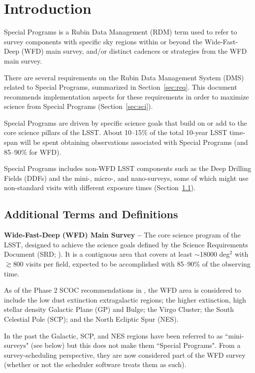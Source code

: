 \section{Introduction} \label{sec:intro}

Special Programs is a Rubin Data Management (RDM) term used to refer to survey 
components with specific sky regions within or beyond the 
Wide-Fast-Deep (WFD) main survey, and/or distinct cadences or 
strategies from the WFD main survey.

There are several requirements on the Rubin Data Management System (DMS) 
related to Special Programs, summarized in Section~\ref{sec:req}.
This document recommends implementation aspects for these requirements in order to 
maximize science from Special Programs (Section~\ref{sec:sci}).

Special Programs are driven by specific science goals that build on or 
add to the core science pillars of the LSST.
About 10--15\% of the total 10-year LSST time-span will be spent obtaining 
observations associated with Special Programs (and 85--90\% for WFD).

Special Programs includes non-WFD LSST components such as the Deep Drilling 
Fields (DDFs) and the mini-, micro-, and nano-surveys, some of which 
might use non-standard visits with different exposure times
(Section~\ref{ssec:intro_terms}).


\subsection{Additional Terms and Definitions}\label{ssec:intro_terms}

\textbf{Wide-Fast-Deep (WFD) Main Survey -- }
The core science program of the LSST, designed to achieve the science 
goals defined by the Science Requirements Document (SRD; ).
It is a contiguous area that covers at least $\sim$18000 deg$^2$ with 
$\gtrsim$800 visits per field, expected to be accomplished with 85--90\% 
of the observing time.

As of the Phase 2 SCOC recommendations in , the WFD area 
is considered to include the low dust extinction extragalactic regions; 
the higher extinction, high stellar density Galactic Plane (GP) and Bulge; the 
Virgo Cluster; the South Celestial Pole (SCP); and the North Ecliptic Spur 
(NES). 

In the past the Galactic, SCP, and NES regions have been referred to as 
``mini-surveys" (see below) but this does not make them ``Special Programs". 
From a survey-scheduling perspective, they are now considered part of the 
WFD survey (whether or not the scheduler software treats them as such).

